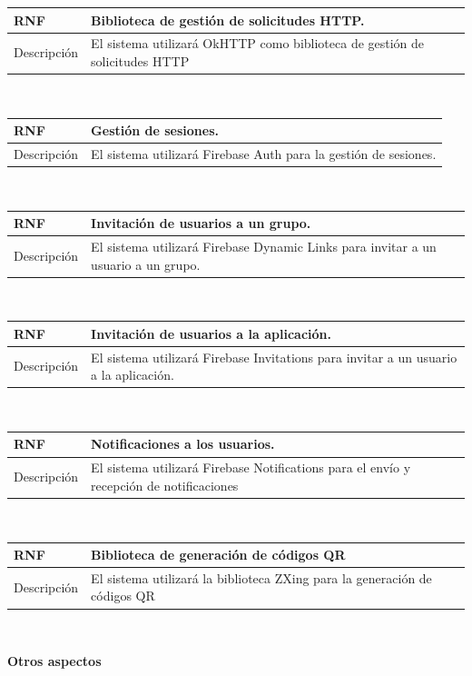 \documentclass[twoside]{report}
\newcommand\addrow[2]{#1 &#2\\ }
\newcommand\addheading[2]{#1 &#2\\ \hline}
\newcommand\tabularhead{\begin{tabular}{lp{0.7\textwidth}}
\hline
}
\newenvironment{req}{\tabularhead}
{\hline\end{tabular}}
\begin{document}
\begin{req}
	\addheading{\textbf{RNF\arabic{nonFunctionalRequirements}}}{Biblioteca de gestión de solicitudes HTTP.}
	\addrow{Descripción}{El sistema utilizará OkHTTP como biblioteca de gestión de solicitudes HTTP}
\end{req}\\

\begin{req}
	\addheading{\textbf{RNF\arabic{nonFunctionalRequirements}}}{Gestión de sesiones.}
	\addrow{Descripción}{El sistema utilizará Firebase Auth para la gestión de sesiones.}
\end{req}\\
	
\begin{req}
	\addheading{\textbf{RNF\arabic{nonFunctionalRequirements}}}{Invitación de usuarios a un grupo.}
	\addrow{Descripción}{El sistema utilizará Firebase Dynamic Links para invitar a un usuario a un grupo.}
\end{req}\\

\begin{req}
	\addheading{\textbf{RNF\arabic{nonFunctionalRequirements}}}{Invitación de usuarios a la aplicación.}
	\addrow{Descripción}{El sistema utilizará Firebase Invitations para invitar a un usuario a la aplicación.}
\end{req}\\

\begin{req}
	\addheading{\textbf{RNF\arabic{nonFunctionalRequirements}}}{Notificaciones a los usuarios.}
	\addrow{Descripción}{El sistema utilizará Firebase Notifications para el envío y recepción de notificaciones}
\end{req}\\

\begin{req}
	\addheading{\textbf{RNF\arabic{nonFunctionalRequirements}}}{Biblioteca de generación de códigos QR}
	\addrow{Descripción}{El sistema utilizará la biblioteca ZXing para la generación de códigos QR}
\end{req}\\


\textbf{Otros aspectos}\\
\end{document}
